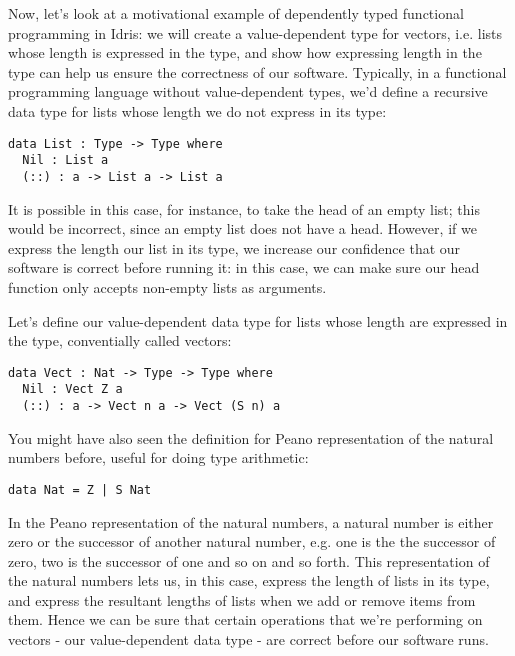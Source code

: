 Now, let's look at a motivational example of dependently typed functional programming in Idris:
we will create a value-dependent type for vectors, i.e. lists whose length is expressed in the type,
and show how expressing length in the type can help us ensure the correctness of our software. Typically, in
a functional programming language without value-dependent types, we'd define a recursive data type for lists whose
length we do not express in its type:
\begin{lstlisting}
data List : Type -> Type where
  Nil : List a
  (::) : a -> List a -> List a
\end{lstlisting}
It is possible in this case, for instance, to take the head of an empty list; this would be incorrect,
since an empty list does not have a head. However, if we express the length our list in its type, we increase our confidence
that our software is correct before running it: in this case, we can make sure our head function only accepts non-empty lists as arguments.

  Let's define our value-dependent data type for lists whose length are expressed in the type, conventially called vectors:
\begin{lstlisting}
data Vect : Nat -> Type -> Type where
  Nil : Vect Z a
  (::) : a -> Vect n a -> Vect (S n) a
\end{lstlisting}
You might have also seen the definition for Peano representation of the natural numbers before, useful for doing type arithmetic:
\begin{lstlisting}
data Nat = Z | S Nat
\end{lstlisting}
In the Peano representation of the natural numbers, a natural number
is either zero or the successor of another natural number, e.g. one is the the successor of zero,
two is the successor of one and so on and so forth. This representation of the natural numbers lets us, in this case,
express the length of lists in its type, and express the resultant lengths of lists when we add or remove items from them. Hence we can be sure that certain operations that we're performing on vectors - our value-dependent data type - are correct before our software runs.
